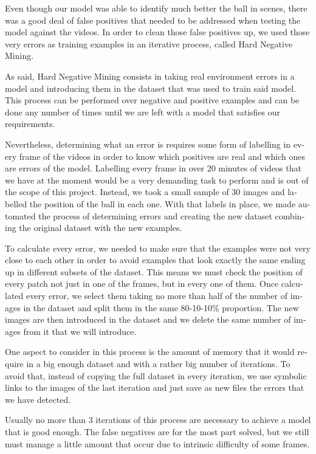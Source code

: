 \begin{otherlanguage}{english}
Even though our model was able to identify much better the ball in scenes, there was a good deal of false positives that needed to be addressed when testing the model against the videos. In order to clean those false positives up, we used those very errors as training examples in an iterative process, called Hard Negative Mining.

As said, Hard Negative Mining consists in taking real environment errors in a model and introducing them in the dataset that was used to train said model. This process can be performed over negative and positive examples and can be done any number of times until we are left with a model that satisfies our requirements.

Nevertheless, determining what an error is requires some form of labelling in every frame of the videos in order to know which positives are real and which ones are errors of the model. Labelling every frame in over 20 minutes of videos that we have at the moment would be a very demanding task to perform and is out of the scope of this project. Instead, we took a small sample of 30 images and labelled the position of the ball in each one. With that labels in place, we made automated the process of determining errors and creating the new dataset combining the original dataset with the new examples.

To calculate every error, we needed to make sure that the examples were not very close to each other in order to avoid examples that look exactly the same ending up in different subsets of the dataset. This means we must check the position of every patch not just in one of the frames, but in every one of them. Once calculated every error, we select them taking no more than half of the number of images in the dataset and split them in the same 80-10-10\% proportion. The new images are then introduced in the dataset and we delete the same number of images from it that we will introduce.

One aspect to consider in this process is the amount of memory that it would require in a big enough dataset and with a rather big number of iterations. To avoid that, instead of copying the full dataset in every iteration, we use symbolic links to the images of the last iteration and just save as new files the errors that we have detected.

Usually no more than 3 iterations of this process are necessary to achieve a model that is good enough. The false negatives are for the most part solved, but we still must manage a little amount that occur due to intrinsic difficulty of some frames.


\end{otherlanguage}
